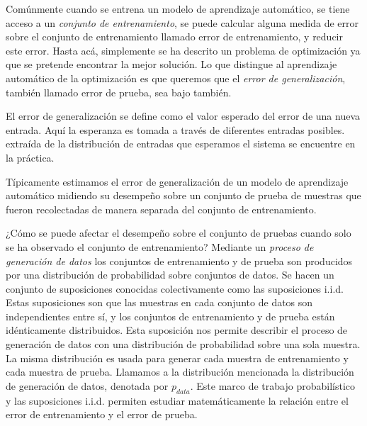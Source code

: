 Comúnmente cuando se entrena un modelo de aprendizaje automático, se
tiene acceso a un \textit{conjunto de entrenamiento}, se puede calcular alguna
medida de error sobre el conjunto de entrenamiento llamado error de
entrenamiento, y reducir este error. Hasta acá, simplemente se ha descrito
un problema de optimización ya que se pretende encontrar la mejor solución.
Lo que distingue al aprendizaje automático de la optimización es que
queremos que el \textit{error de generalización}, también llamado error de
prueba, sea bajo también.\\

\begin{remark}
El error de generalización se define como el valor esperado del error de
una nueva entrada. Aquí la esperanza es tomada a través de diferentes
entradas posibles. extraída de la distribución de entradas que esperamos
el sistema se encuentre en la práctica.
\end{remark}


Típicamente estimamos el error de generalización de un modelo de
aprendizaje automático midiendo su desempeño sobre un conjunto de prueba de
muestras que fueron recolectadas de manera separada del conjunto de
entrenamiento.

¿Cómo se puede afectar el desempeño sobre el conjunto de pruebas cuando
solo se ha observado el conjunto de entrenamiento? 
Mediante un \textit{proceso de generación de datos} los conjuntos de 
entrenamiento y de prueba son producidos por una 
distribución de probabilidad sobre conjuntos de datos. 
Se hacen un conjunto de suposiciones conocidas
colectivamente como las suposiciones i.i.d. Estas suposiciones son que
las muestras en cada conjunto de datos son independientes entre sí, y
los conjuntos de entrenamiento y de prueba están idénticamente
distribuidos. Esta suposición nos permite describir el proceso de
generación de datos con una distribución de probabilidad sobre una sola
muestra. La misma distribución es usada para generar cada muestra de
entrenamiento y cada muestra de prueba. Llamamos a la distribución
mencionada la distribución de generación de datos, denotada por $p_{data}$.
Este marco de trabajo probabilístico y las suposiciones i.i.d. permiten
estudiar matemáticamente la relación entre el error de entrenamiento y
el error de prueba.

